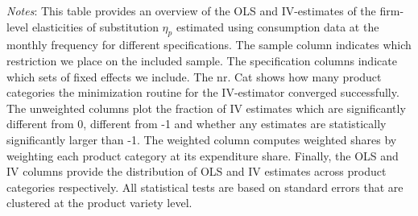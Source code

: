 \begin{landscape}
    \begin{table}[H]
        \centering
        \caption{Monthtly Firm-level Elasticities: Dispersion instrument}
        \label{tab: app_elas_eta_cats_monthly_q}
        \begin{spacing}{1}
        \end{spacing}
        \parbox{1.2\textwidth}{
        \vspace{10pt}
        \begin{spacing}{1} 
            {\footnotesize 
            \textit{Notes}: This table provides an overview of the OLS and IV-estimates of the firm-level elasticities of substitution $\eta_p$ estimated using consumption data at the monthly frequency for different specifications. The sample column indicates which restriction we place on the included sample. The specification columns indicate which sets of fixed effects we include. The nr. Cat shows how many product categories the minimization routine for the IV-estimator converged successfully. The unweighted columns plot the fraction of IV estimates which are significantly different from 0, different from -1 and whether any estimates are statistically significantly larger than -1. The weighted column computes weighted shares by weighting each product category at its expenditure share. Finally, the OLS and IV columns provide the distribution of OLS and IV estimates across product categories respectively. All statistical tests are based on standard errors that are clustered at the product variety level.}
            \end{spacing}}
    \end{table}
\end{landscape}

